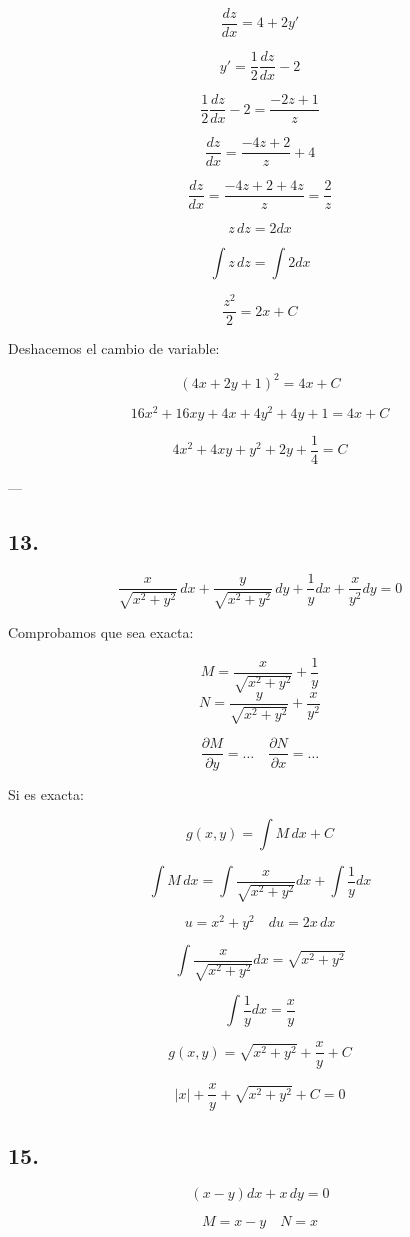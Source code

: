 \documentclass[a4paper,12pt]{article}
\begin{document}
\[
\frac{dz}{dx} = 4 + 2y'
\]

\[
y' = \frac{1}{2} \frac{dz}{dx} - 2
\]

\[
\frac{1}{2}\frac{dz}{dx} - 2 = \frac{-2z + 1}{z}
\]

\[
\frac{dz}{dx} = \frac{-4z + 2}{z} + 4
\]

\[
\frac{dz}{dx} = \frac{-4z + 2 + 4z}{z} = \frac{2}{z}
\]

\[
z\, dz = 2 dx
\]

\[
\int z\, dz = \int 2 dx
\]

\[
\frac{z^2}{2} = 2x + C
\]

Deshacemos el cambio de variable:

\[
(4x + 2y + 1)^2 = 4x + C
\]

\[
16x^2 + 16xy + 4x + 4y^2 + 4y + 1 = 4x + C
\]

\[
4x^2 + 4xy + y^2 + 2y + \frac{1}{4} = C
\]

---

\subsection*{13.}
\[
\frac{x}{\sqrt{x^2 + y^2}}\, dx + \frac{y}{\sqrt{x^2 + y^2}}\, dy + \frac{1}{y} dx + \frac{x}{y^2} dy = 0
\]

Comprobamos que sea exacta:

\[
M = \frac{x}{\sqrt{x^2 + y^2}} + \frac{1}{y}
\]
\[
N = \frac{y}{\sqrt{x^2 + y^2}} + \frac{x}{y^2}
\]

\[
\frac{\partial M}{\partial y} = \dots \quad \frac{\partial N}{\partial x} = \dots
\]

Si es exacta:

\[
g(x,y) = \int M\, dx + C
\]

\[
\int M\, dx = \int \frac{x}{\sqrt{x^2 + y^2}} dx + \int \frac{1}{y} dx
\]

\[
u = x^2 + y^2 \quad du = 2x\, dx
\]

\[
\int \frac{x}{\sqrt{x^2 + y^2}} dx = \sqrt{x^2 + y^2}
\]

\[
\int \frac{1}{y} dx = \frac{x}{y}
\]

\[
g(x,y) = \sqrt{x^2 + y^2} + \frac{x}{y} + C
\]

\[
|x| + \frac{x}{y} + \sqrt{x^2 + y^2} + C = 0
\]
\subsection*{15.}
\[
(x - y)dx + x\, dy = 0
\]

\[
M = x - y \quad N = x
\]
\end{document}
